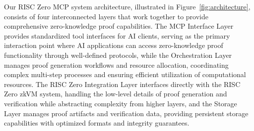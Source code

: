 \documentclass[11pt]{article}
\begin{document}
Our RISC Zero MCP system architecture, illustrated in Figure~\ref{fig:architecture}, consists of four interconnected layers that work together to provide comprehensive zero-knowledge proof capabilities. The MCP Interface Layer provides standardized tool interfaces for AI clients, serving as the primary interaction point where AI applications can access zero-knowledge proof functionality through well-defined protocols, while the Orchestration Layer manages proof generation workflows and resource allocation, coordinating complex multi-step processes and ensuring efficient utilization of computational resources. The RISC Zero Integration Layer interfaces directly with the RISC Zero zkVM system, handling the low-level details of proof generation and verification while abstracting complexity from higher layers, and the Storage Layer manages proof artifacts and verification data, providing persistent storage capabilities with optimized formats and integrity guarantees.
\end{document}
